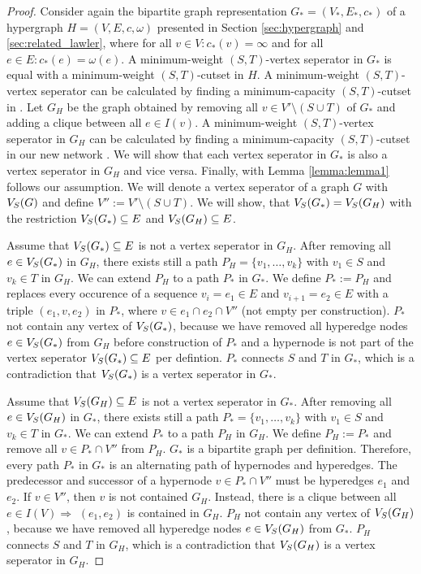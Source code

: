 \begin{proof}

Consider again the bipartite graph representation $G_* = (V_*,E_*,c_*)$ 
of a hypergraph $H = (V,E,c,\omega)$ presented in Section \ref{sec:hypergraph} and \ref{sec:related_lawler}, 
where for all $v \in V: c_*(v) = \infty$ and for all $e \in E: c_*(e) = 
\omega(e)$. A minimum-weight $(S,T)$-vertex seperator in $G_*$ is equal
with a minimum-weight $(S,T)$-cutset in $H$. A minimum-weight $(S,T)$-vertex seperator can be calculated
by finding a minimum-capacity $(S,T)$-cutset in . Let $G_H$ be the graph obtained by removing
all $v \in V'\setminus (S \cup T)$ of $G_*$ and adding a clique between all $e \in I(v)$. 
A minimum-weight $(S,T)$-vertex seperator in $G_H$ can be calculated by finding a 
minimum-capacity $(S,T)$-cutset in our new network .
We will show that each vertex seperator in $G_*$ is also a vertex seperator in $G_H$ and
vice versa. Finally, with Lemma \ref{lemma:lemma1} follows our assumption. We will 
denote a vertex seperator of a graph $G$ with $V_S(G)$ and define $V'' := V' \setminus (S \cup T)$. 
We will show, that $V_S(G_*) = V_S(G_H)$ with the restriction $V_S(G_*) \subseteq E$ and
$V_S(G_H) \subseteq E$.

Assume that $V_S(G_*) \subseteq E$ is not a vertex seperator in $G_H$. After removing all $e \in V_S(G_*)$ in
$G_H$, there exists still a path $P_H = \{v_1, \ldots, v_k\}$ with $v_1 \in S$ and
$v_k \in T$ in $G_H$. We can extend $P_H$ to a path $P_*$ in $G_*$.
We define $P_* := P_H$ and replaces every occurence of a sequence $v_i = e_1 \in E$ and
$v_{i+1} = e_2 \in E$ with a triple $(e_1,v,e_2)$ in $P_*$, where $v \in e_1 \cap e_2 \cap V''$
(not empty per construction). $P_*$ not contain any vertex of $V_S(G_*)$, because
we have removed all hyperedge nodes $e \in V_S(G_*)$ from $G_H$ before construction of $P_*$ 
and a hypernode is not part of  the vertex seperator $V_S(G_*) \subseteq E$ per defintion. 
$P_*$ connects $S$ and $T$ in $G_*$, which is a contradiction that $V_S(G_*)$ 
is a vertex seperator in $G_*$.

Assume that $V_S(G_H) \subseteq E$ is not a vertex seperator in $G_*$. After removing all $e \in V_S(G_H)$ in
$G_*$, there exists still a path $P_* = \{v_1, \ldots, v_k\}$ with $v_1 \in S$ and
$v_k \in T$ in $G_*$. We can extend $P_*$ to a path $P_H$ in $G_H$.
We define $P_H := P_*$ and remove all $v \in P_* \cap V''$ from $P_H$. $G_*$ is a bipartite
graph per definition. Therefore, every path $P_*$ in $G_*$ is an alternating path of hypernodes and
hyperedges. The predecessor and successor of a hypernode $v \in P_* \cap V''$ must be hyperedges
$e_1$ and $e_2$. If $v \in V''$, then $v$ is not contained $G_H$. Instead, there is
a clique between all $e \in I(V) \Rightarrow$ $(e_1,e_2)$ is contained in $G_H$.
$P_H$ not contain any vertex of $V_S(G_H)$, because we have removed all hyperedge nodes $e \in V_S(G_H)$ 
from $G_*$. $P_H$ connects $S$ and $T$ in $G_H$, which is a contradiction that 
$V_S(G_H)$ is a vertex seperator in $G_H$.


\end{proof}
